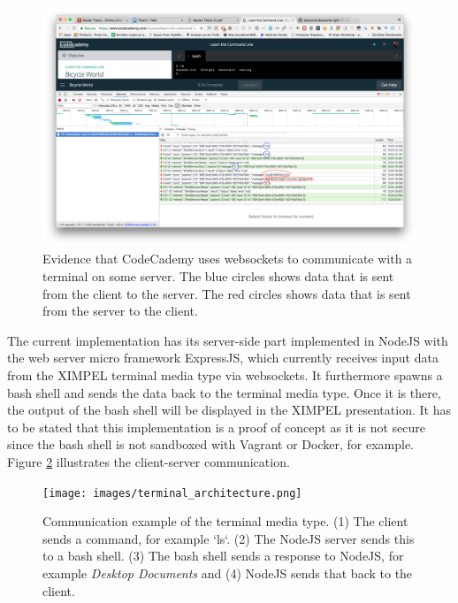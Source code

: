 \begin{figure}
\centering
\includegraphics[width=1.35\textwidth, center]{codecademy_websockets.png} %
\caption{Evidence that CodeCademy uses websockets to communicate with a terminal on some server. The blue circles shows data that is sent from the client to the server. The red circles shows data that is sent from the server to the client.}
\label{fig:codecademy_websockets}
\end{figure}

The current implementation has its server-side part implemented in NodeJS with the web server micro framework ExpressJS, which currently receives input data from the XIMPEL terminal media type via websockets. It furthermore spawns a bash shell and sends the data back to the terminal media type. Once it is there, the output of the bash shell will be displayed in the XIMPEL presentation. It has to be stated that this implementation is a proof of concept as it is not secure since the bash shell is not sandboxed with Vagrant or Docker, for example. Figure \ref{images:terminal_architecture} illustrates the client-server communication.

\begin{figure}
\centering
\texttt{[image: images/terminal\_architecture.png]} %
\caption{Communication example of the terminal media type. (1) The client sends a command, for example `ls`. (2) The NodeJS server sends this to a bash shell. (3) The bash shell sends a response to NodeJS, for example \textit{Desktop Documents} and (4) NodeJS sends that back to the client.}
\label{images:terminal_architecture}
\end{figure}

